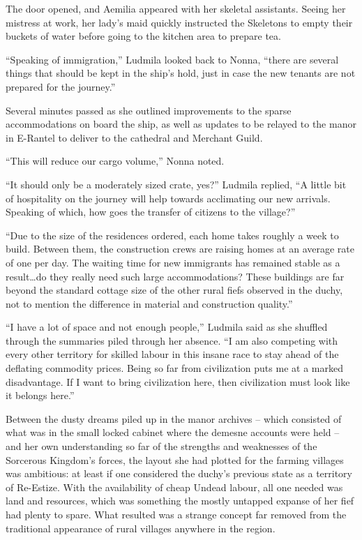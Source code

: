  

The door opened, and Aemilia appeared with her skeletal assistants. Seeing her mistress at work, her lady’s maid quickly instructed the Skeletons to empty their buckets of water before going to the kitchen area to prepare tea.

 

“Speaking of immigration,” Ludmila looked back to Nonna, “there are several things that should be kept in the ship’s hold, just in case the new tenants are not prepared for the journey.”

 

Several minutes passed as she outlined improvements to the sparse accommodations on board the ship, as well as updates to be relayed to the manor in E-Rantel to deliver to the cathedral and Merchant Guild.

 

“This will reduce our cargo volume,” Nonna noted.

 

“It should only be a moderately sized crate, yes?” Ludmila replied, “A little bit of hospitality on the journey will help towards acclimating our new arrivals. Speaking of which, how goes the transfer of citizens to the village?”

 

“Due to the size of the residences ordered, each home takes roughly a week to build. Between them, the construction crews are raising homes at an average rate of one per day. The waiting time for new immigrants has remained stable as a result…do they really need such large accommodations? These buildings are far beyond the standard cottage size of the other rural fiefs observed in the duchy, not to mention the difference in material and construction quality.”

 

“I have a lot of space and not enough people,” Ludmila said as she shuffled through the summaries piled through her absence. “I am also competing with every other territory for skilled labour in this insane race to stay ahead of the deflating commodity prices. Being so far from civilization puts me at a marked disadvantage. If I want to bring civilization here, then civilization must look like it belongs here.”

 

Between the dusty dreams piled up in the manor archives – which consisted of what was in the small locked cabinet where the demesne accounts were held – and her own understanding so far of the strengths and weaknesses of the Sorcerous Kingdom’s forces, the layout she had plotted for the farming villages was ambitious: at least if one considered the duchy’s previous state as a territory of Re-Estize. With the availability of cheap Undead labour, all one needed was land and resources, which was something the mostly untapped expanse of her fief had plenty to spare. What resulted was a strange concept far removed from the traditional appearance of rural villages anywhere in the region.

